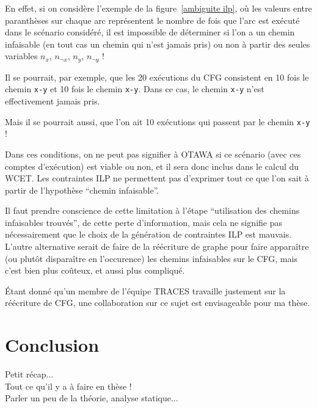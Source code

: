 \documentclass[french]{article}
\begin{document}
  En effet, si on considère l'exemple de la figure~\ref{ambiguite ilp}, où les valeurs entre paranthèses sur chaque arc représentent le nombre de fois que l'arc est exécuté dans le scénario considéré, il est impossible de déterminer si l'on a un chemin infaisable (en tout cas un chemin qui n'est jamais pris) ou non à partir des seules variables $n_x$, $n_{\neg x}$, $n_y$, $n_{\neg y}$ !

  Il se pourrait, par exemple, que les 20 exécutions du CFG consistent en 10 fois le chemin \texttt{x-\textlnot y} et 10 fois le chemin \texttt{\textlnot x-y}. Dans ce cas, le chemin \texttt{x-y} n'est effectivement jamais pris.

  Mais il se pourrait aussi, que l'on ait 10 exécutions qui passent par le chemin \texttt{x-y} !

  Dans ces conditions, on ne peut pas signifier à OTAWA si ce scénario (avec ces comptes d'exécution) est viable ou non, et il sera donc inclus dans le calcul du WCET. Les contraintes ILP ne permettent pas d'exprimer tout ce que l'on sait à partir de l'hypothèse ``chemin infaisable''.

  Il faut prendre conscience de cette limitation à l'étape ``utilisation des chemins infaisables trouvés'', de cette perte d'information, mais cela ne signifie pas nécessairement que le choix de la génération de contraintes ILP est mauvais. L'autre alternative serait de faire de la réécriture de graphe pour faire apparaître (ou plutôt disparaître en l'occurence) les chemins infaisables sur le CFG, mais c'est bien plus coûteux, et aussi plus compliqué.

  \'Etant donné qu'un membre de l'équipe TRACES travaille justement sur la réécriture de CFG, une collaboration sur ce sujet est envisageable pour ma thèse.

  \newpage{}
  \section*{Conclusion}
  Petit récap...\\
  Tout ce qu'il y a à faire en thèse !\\
  Parler un peu de la théorie, analyse statique...\\
\end{document}
